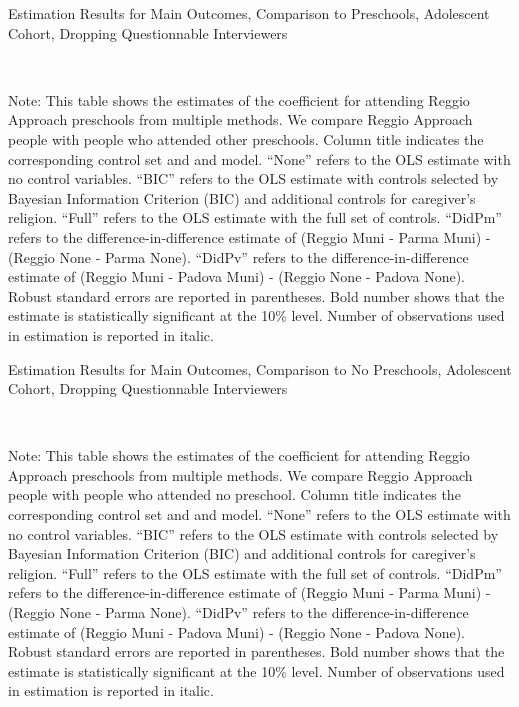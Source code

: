 \begin{table}[H] \caption{Estimation Results for Main Outcomes, Comparison to Preschools, Adolescent Cohort, Dropping Questionnable Interviewers} \label{ols-M-adol-reg-pres-dropint}
\scalebox{0.8}{}
\vspace{1ex} \\
\footnotesize\raggedright{Note: This table shows the estimates of the coefficient for attending Reggio Approach preschools from multiple methods. We compare Reggio Approach people with people who attended other preschools. Column title indicates the corresponding control set and and model. ``None'' refers to the OLS estimate with no control variables. ``BIC'' refers to the OLS estimate with controls selected by Bayesian Information Criterion (BIC) and additional controls for caregiver's religion. ``Full'' refers to the OLS estimate with the full set of controls. ``DidPm'' refers to the difference-in-difference estimate of (Reggio Muni - Parma Muni) - (Reggio None - Parma None). ``DidPv'' refers to the difference-in-difference estimate of (Reggio Muni - Padova Muni) - (Reggio None - Padova None). Robust standard errors are reported in parentheses. Bold number shows that the estimate is statistically significant at the 10\% level. Number of observations used in estimation is reported in italic.}
\end{table}

\begin{table}[H] \caption{Estimation Results for Main Outcomes, Comparison to No Preschools, Adolescent Cohort, Dropping Questionnable Interviewers} \label{ols-M-adol-reg-nopres-dropint}
\scalebox{0.8}{}
\vspace{1ex} \\
\footnotesize\raggedright{Note: This table shows the estimates of the coefficient for attending Reggio Approach preschools from multiple methods. We compare Reggio Approach people with people who attended no preschool. Column title indicates the corresponding control set and and model. ``None'' refers to the OLS estimate with no control variables. ``BIC'' refers to the OLS estimate with controls selected by Bayesian Information Criterion (BIC) and additional controls for caregiver's religion. ``Full'' refers to the OLS estimate with the full set of controls. ``DidPm'' refers to the difference-in-difference estimate of (Reggio Muni - Parma Muni) - (Reggio None - Parma None). ``DidPv'' refers to the difference-in-difference estimate of (Reggio Muni - Padova Muni) - (Reggio None - Padova None). Robust standard errors are reported in parentheses. Bold number shows that the estimate is statistically significant at the 10\% level. Number of observations used in estimation is reported in italic.}
\end{table}




